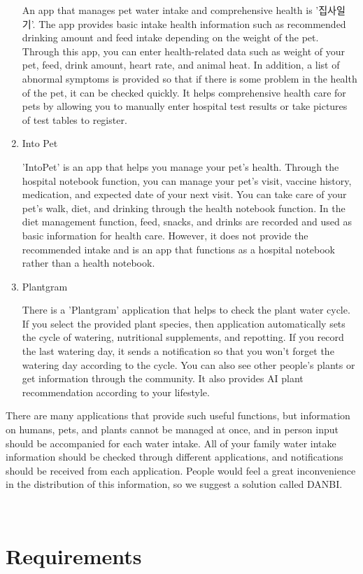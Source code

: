 \documentclass[conference]{IEEEtran}
\begin{document}
\begin{enumerate}
An app that manages pet water intake and comprehensive health is '집사일기'. The app provides basic intake health information such as recommended drinking amount and feed intake depending on the weight of the pet. Through this app, you can enter health-related data such as weight of your pet, feed, drink amount, heart rate, and animal heat. In addition, a list of abnormal symptoms is provided so that if there is some problem in the health of the pet, it can be checked quickly. It helps comprehensive health care for pets by allowing you to manually enter hospital test results or take pictures of test tables to register.
\item Into Pet 

'IntoPet' is an app that helps you manage your pet's health. Through the hospital notebook function, you can manage your pet's visit, vaccine history, medication, and expected date of your next visit. You can take care of your pet's walk, diet, and drinking through the health notebook function. In the diet management function, feed, snacks, and drinks are recorded and used as basic information for health care. However, it does not provide the recommended intake and is an app that functions as a hospital notebook rather than a health notebook.
\item Plantgram 

There is a 'Plantgram' application that helps to check the plant water cycle. If you select the provided plant species, then application automatically sets the cycle of watering, nutritional supplements, and repotting. If you record the last watering day, it sends a notification so that you won't forget the watering day according to the cycle. You can also see other people's plants or get information through the community. It also provides AI plant recommendation according to your lifestyle.
\end{enumerate}
There are many applications that provide such useful functions, but information on humans, pets, and plants cannot be managed at once, and in person input should be accompanied for each water intake. All of your family water intake information should be checked through different applications, and notifications should be received from each application. People would feel a great inconvenience in the distribution of this information, so we suggest a solution called DANBI.

\ 
\ 

\section{Requirements}
\end{document}
